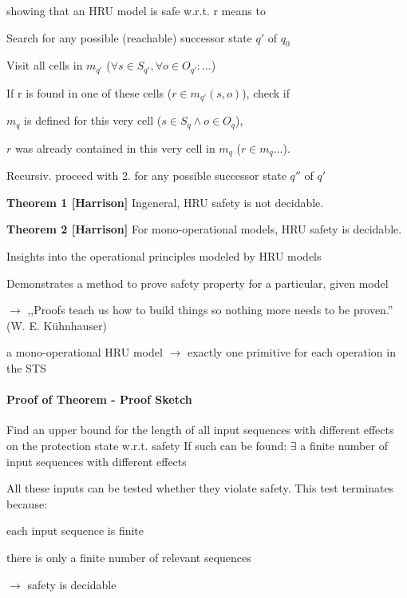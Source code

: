 \documentclass[a4paper]{article}
\renewcommand{\note}[2]{\begin{noteBox} \textbf{#1} #2 \end{noteBox}}
\begin{document}
\begin{multicols}{3}
    showing that an HRU model is safe w.r.t. r means to
    \begin{enumerate*}
        \item Search for any possible (reachable) successor state $q'$ of $q_0$
        \item Visit all cells in $m_{q'}$ ($\forall s\in S_{q'},\forall o\in O_{q'}:\dots $)
        \item If r is found in one of these cells ($r\in m_{q'}(s,o)$), check if
        \begin{itemize*}
            \item $m_q$ is defined for this very cell ($s\in S_q\wedge o\in O_q$),
            \item $r$ was already contained in this very cell in $m_q$ ($r\in m_q\dots $).
        \end{itemize*}
        \item Recursiv. proceed with 2. for any possible successor state $q''$ of $q'$
    \end{enumerate*}

    \note{Theorem 1 [Harrison]}{Ingeneral, HRU safety is not decidable.}

    \note{Theorem 2 [Harrison]}{For mono-operational models, HRU safety is decidable.}
    \begin{itemize*}
        \item Insights into the operational principles modeled by HRU models
        \item Demonstrates a method to prove safety property for a particular, given model
        \item[$\rightarrow$] ,,Proofs teach us how to build things so nothing more needs to be proven.'' (W. E. Kühnhauser)
    \end{itemize*}

    a mono-operational HRU model $\rightarrow$ exactly one primitive for each operation in the STS

    \paragraph{Proof of Theorem - Proof Sketch}
    \begin{enumerate*}
        \item Find an upper bound for the length of all input sequences with different effects on the protection state w.r.t. safety
        If such can be found: $\exists$ a finite number of input sequences with different effects
        \item All these inputs can be tested whether they violate safety. This test terminates because:
        \begin{itemize*}
            \item each input sequence is finite
            \item there is only a finite number of relevant sequences
        \end{itemize*}
        \item[$\rightarrow$] safety is decidable
    \end{enumerate*}


\end{multicols}
\end{document}

